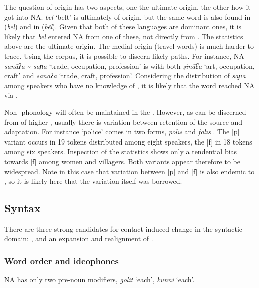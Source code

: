\documentclass[output=paper]{langsci/langscibook}
\begin{document}
The question of origin has two aspects, one the ultimate origin, the other how it got into NA. \textit{bel} ‘belt’ is ultimately of  origin, but the same word is also found in  (\textit{bel}) and in  (\textit{bêl}). Given that both of these languages are dominant ones, it is likely that \textit{bel} entered NA from one of these, not directly from . The statistics above are the ultimate origin. The medial origin (travel words) is much harder to trace. Using the corpus, it is possible to discern likely paths. For instance, NA \textit{sanāʔa} {\textasciitilde} \textit{saɲa} ‘trade, occupation, profession’ is  with both   \textit{ṣināʕa} ‘art, occupation, craft’ and  \textit{sanāʔā} `trade, craft, profession'. Considering the distribution of \textit{saɲa} among speakers who have no knowledge of  , it is likely that the word reached NA via .

Non- phonology will often be maintained in the . However, as can be discerned from  of higher , usually there is variation between retention of the source  and adaptation. For instance ‘police’ comes in two forms, \textit{polīs} and \textit{folīs} \citep[278]{Owens2000article}. The [p] variant occurs in 19 tokens distributed among eight speakers, the [f] in 18 tokens among six speakers. Inspection of the statistics shows only a tendential bias towards [f] among women and villagers. Both variants appear therefore to be widespread. Note in this case that variation between [p] and [f] is also endemic to , so it is likely here that the variation itself was borrowed.

\subsection{Syntax}

There are three strong candidates for contact-induced change in the syntactic domain: ,  and an expansion and realignment of .

\subsubsection{Word order and ideophones}

NA has only two pre-noun modifiers, \textit{gōlit} ‘each’, \textit{kunni} ‘each’.
\end{document}
